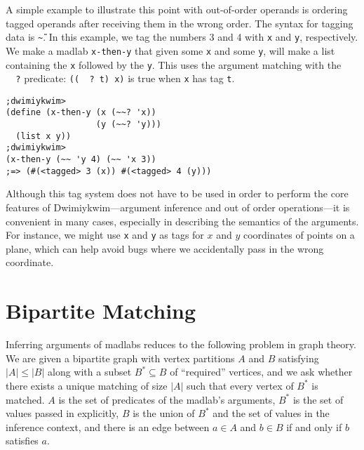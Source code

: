 \documentclass[11pt]{article}
\begin{document}
A simple example to illustrate this point with out-of-order operands
is ordering tagged operands after receiving them in the wrong order.
The syntax for tagging data is \texttt{\~\~}.
In this example, we tag the numbers 3 and 4 with \texttt{x} and \texttt{y},
respectively.
We make a madlab \texttt{x-then-y} that
given some \texttt{x} and some \texttt{y},
will make a list containing the \texttt{x} followed by the \texttt{y}.
This uses the argument matching with the \texttt{~~?} predicate:
\texttt{((~~? t) x)} is true when \texttt{x} has tag \texttt{t}.
\begin{Verbatim}
;dwimiykwim>
(define (x-then-y (x (~~? 'x))
                  (y (~~? 'y)))
  (list x y))
;dwimiykwim>
(x-then-y (~~ 'y 4) (~~ 'x 3))
;=> (#(<tagged> 3 (x)) #(<tagged> 4 (y)))
\end{Verbatim}
Although this tag system does not have to be used in order to perform
the core features of Dwimiykwim---argument inference
and out of order operations---it is convenient
in many cases, especially in describing the semantics of the arguments.
For instance, we might use \texttt{x} and \texttt{y} as tags for
$x$ and $y$ coordinates of points on a plane,
which can help avoid bugs where we accidentally pass in the wrong coordinate.


\section{Bipartite Matching}\label{bipartite}

Inferring arguments of madlabs
reduces to the following problem in graph theory.
We are given a bipartite graph with vertex partitions $A$ and $B$
satisfying $|A| \leq |B|$
along with a subset $B^* \subseteq B$ of ``required'' vertices,
and we ask whether there exists a unique matching of size $|A|$
such that every vertex of $B^*$ is matched.
$A$ is the set of predicates of the madlab's arguments,
$B^*$ is the set of values passed in explicitly,
$B$ is the union of $B^*$ and the set of values in the inference context,
and there is an edge between $a \in A$ and $b \in B$
if and only if $b$ satisfies $a$.
\end{document}
